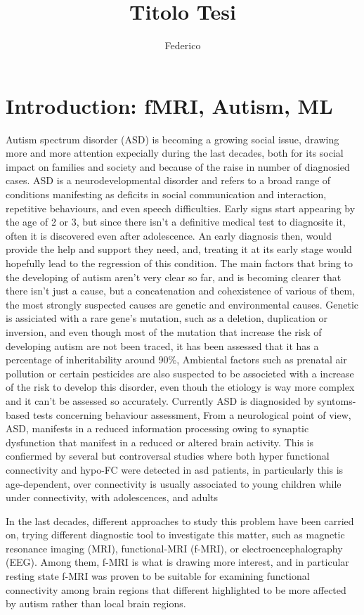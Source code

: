 \documentclass[a4paper,11pt]{article}
\title{Titolo Tesi}
\author{Federico}
\begin{document}
\maketitle
\tableofcontents

\section{Introduction: fMRI, Autism, ML}
Autism spectrum disorder (ASD) is becoming a growing social issue, drawing more and more attention expecially during the last decades, both for its social impact on families and society and because of the raise in number of diagnosied cases.
ASD is a neurodevelopmental disorder and refers to a broad range of conditions manifesting as deficits in social communication and interaction, repetitive behaviours, and even speech difficulties.
Early signs start appearing by the age of 2 or 3, but since there isn't a definitive medical test to diagnosite it, often it is discovered even after adolescence. An early diagnosis then, would provide the help and support they need, and, treating it at its early stage would hopefully lead to the regression of this condition.
The main factors that bring to the developing of autism aren't very clear so far, and is becoming clearer that there isn't just a cause, but a concatenation and cohexistence of various of them, the most strongly suspected causes are genetic and environmental causes.
Genetic is assiciated with a rare gene's mutation, such as a deletion, duplication or inversion, and even though most of the mutation that increase the risk of developing autism are not been traced, it has been assessed that it has a percentage of inheritability around 90\%,
Ambiental factors such as prenatal air pollution or certain pesticides are also suspected to be associeted with a increase of the risk to develop this disorder, even thouh the etiology is way more complex and it can't be assessed so accurately.
Currently ASD is diagnosided by syntoms-based tests concerning behaviour assessment,
From a neurological point of view, ASD, manifests in a reduced information processing owing to synaptic dysfunction that manifest in a reduced or altered brain activity.
This is confiermed by several but controversal studies where both hyper functional connectivity and hypo-FC were detected in asd patients, in particularly this is age-dependent, over connectivity is usually associated to young children while under connectivity, with adolescences, and adults

In the last decades, different approaches to study this problem have been carried on, trying different diagnostic tool to investigate this matter, such as magnetic resonance imaging (MRI), functional-MRI (f-MRI), or electroencephalography (EEG).
Among them, f-MRI is what is drawing more interest, and in particular resting state f-MRI was proven to be suitable for examining functional connectivity among brain regions that different highlighted to be more affected by autism rather than local brain regions.
\end{document}
